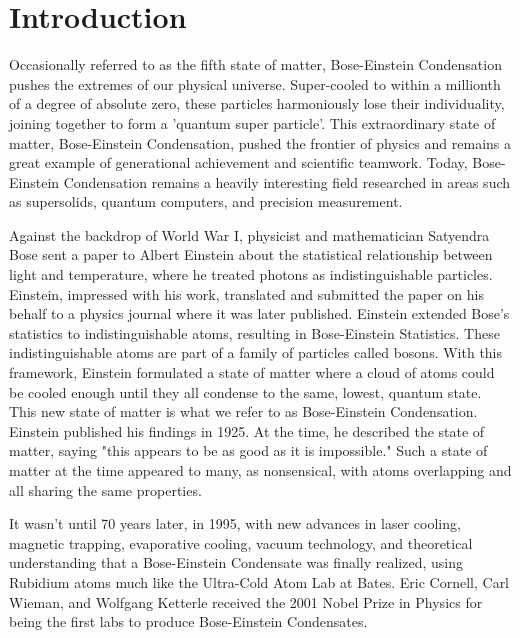 \chapter*{Introduction}

Occasionally referred to as the fifth state of matter, Bose-Einstein Condensation pushes the extremes of our physical universe. Super-cooled to within a millionth of a degree of absolute zero, these particles harmoniously lose their individuality, joining together to form a 'quantum super particle'. This extraordinary state of matter, Bose-Einstein Condensation, pushed the frontier of physics and remains a great example of generational achievement and scientific teamwork. Today, Bose-Einstein Condensation remains a heavily interesting field researched in areas such as supersolids, quantum computers, and precision measurement. 


Against the backdrop of World War I, physicist and mathematician Satyendra Bose sent a paper to Albert Einstein about the statistical relationship between light and temperature, where he treated photons as indistinguishable particles. Einstein, impressed with his work, translated and submitted the paper on his behalf to a physics journal where it was later published. Einstein extended Bose's statistics to indistinguishable atoms, resulting in Bose-Einstein Statistics. These indistinguishable atoms are part of a family of particles called bosons. With this framework, Einstein formulated a state of matter where a cloud of atoms could be cooled enough until they all condense to the same, lowest, quantum state. This new state of matter is what we refer to as Bose-Einstein Condensation. Einstein published his findings in 1925. At the time, he described the state of matter, saying "this appears to be as good as it is impossible." Such a state of matter at the time appeared to many, as nonsensical, with atoms overlapping and all sharing the same properties. 


It wasn't until 70 years later, in 1995, with new advances in laser cooling, magnetic trapping, evaporative cooling, vacuum technology, and theoretical understanding that a Bose-Einstein Condensate was finally realized, using Rubidium atoms much like the Ultra-Cold Atom Lab at Bates. Eric Cornell, Carl Wieman, and Wolfgang Ketterle received the 2001 Nobel Prize in Physics for being the first labs to produce Bose-Einstein Condensates.


